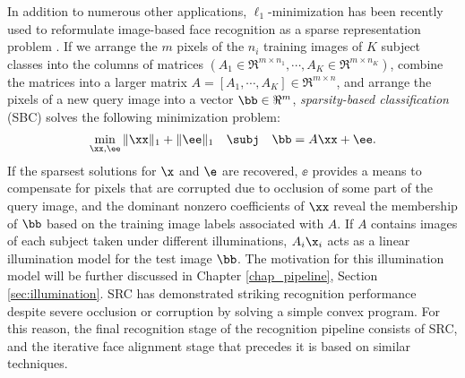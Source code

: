 In addition to numerous other applications, $\ell_1$-minimization has been recently used to reformulate
image-based face recognition as a sparse representation problem
\cite{WrightJ2009-PAMI}.  If we arrange the $m$ pixels of the $n_i$ training images of $K$ subject
classes into the columns of matrices $(A_1\in\Re^{m\times n_1}, \cdots, A_K\in\Re^{m\times n_K})$, combine
the matrices into a larger matrix $A = [A_1, \cdots, A_K]\in\Re^{m\times n}$, and arrange the pixels of a new
query image into a vector $\bb\in\Re^m$, \emph{sparsity-based
classification} (SBC) solves the following minimization problem:
\begin{equation}
\min_{\xx, \ee} \| \xx \|_1 + \|\ee\|_1 \quad \subj \quad \bb = A \xx + \ee.
\label{eq:l1min_denoise}
\end{equation}
If the sparsest solutions for $\x$ and $\e$ are recovered, $\ee$ provides a
means to compensate for pixels that are corrupted due to occlusion of some part of the query
image, and the dominant nonzero coefficients of $\xx$ reveal the membership of
$\bb$ based on the training image labels associated with $A$. 
If $A$ contains images of each subject taken under different illuminations, 
$A_i\x_i$ acts as a linear illumination model for the test image $\bb$.  The motivation
for this illumination model will be further discussed in Chapter \ref{chap_pipeline}, Section \ref{sec:illumination}.
SRC has demonstrated striking recognition performance
despite severe occlusion or corruption by solving a simple convex program.  For
this reason, the final recognition stage of the recognition pipeline consists of
SRC, and the iterative face alignment stage that precedes it is based on
similar techniques.

